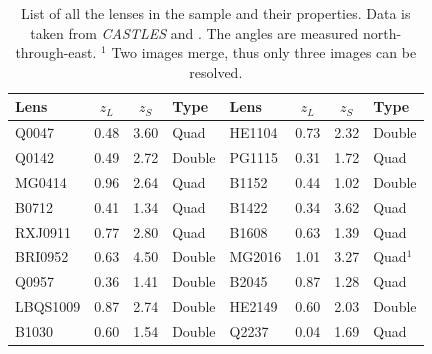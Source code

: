 \documentclass[useAMS,usenatbib]{mn2e}
\begin{document}
\begin{table}
 \begin{center}
  \begin{tabular}{l c c l | l c c l}
   Lens & $z_{L}$ & $z_{S}$ & Type & Lens & $z_{L}$ & $z_{S}$ & Type\\ \hline \hline
   Q0047 & 0.48 & 3.60 & Quad & HE1104 & 0.73 & 2.32 & Double\\
   Q0142 & 0.49 & 2.72 & Double & PG1115 & 0.31 & 1.72 & Quad\\
   MG0414 & 0.96 & 2.64 & Quad & B1152 & 0.44 & 1.02 & Double\\
   B0712 & 0.41 & 1.34 & Quad & B1422 & 0.34 & 3.62 & Quad\\
   RXJ0911 & 0.77 & 2.80 & Quad & B1608 & 0.63 & 1.39 & Quad\\
   BRI0952 & 0.63 & 4.50 & Double & MG2016 & 1.01 & 3.27 & Quad$^{1}$\\
   Q0957 & 0.36 & 1.41 & Double & B2045 & 0.87 & 1.28 & Quad\\
   LBQS1009 & 0.87 & 2.74 & Double & HE2149 & 0.60 & 2.03 & Double\\
   B1030 & 0.60 & 1.54 & Double & Q2237 & 0.04 & 1.69 & Quad\\
  \end{tabular}
  \caption{List of all the lenses in the sample and their properties. Data is taken from \textit{CASTLES} and \cite{leier11phd}. The angles are measured north-through-east. \newline $^{1}$ Two images merge, thus only three images can be resolved.}
  \label{tab:overview}
 \end{center}
\end{table}
\end{document}
